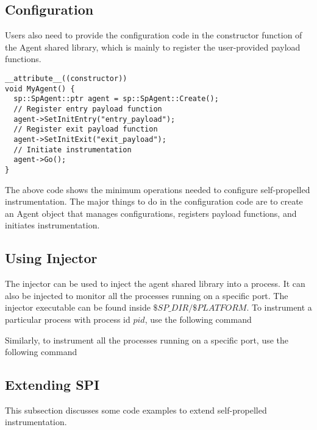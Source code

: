 \subsection{Configuration}
Users also need to provide the configuration code in the constructor
function of
the Agent shared library, which is mainly to register the user-provided payload
functions.
\lstset{numbers=left}
\begin{lstlisting}[caption=Configuration code]
__attribute__((constructor))
void MyAgent() {
  sp::SpAgent::ptr agent = sp::SpAgent::Create();
  // Register entry payload function
  agent->SetInitEntry("entry_payload");
  // Register exit payload function
  agent->SetInitExit("exit_payload");
  // Initiate instrumentation
  agent->Go();
}
\end{lstlisting}
The above code shows the minimum operations needed to configure self-propelled
instrumentation.  The major things to do in the configuration code are to create
an Agent object that manages configurations, registers payload functions, and
initiates instrumentation.

\subsection{Using Injector}
The injector can be used to inject the agent shared library into a process. It
can also be injected to monitor all the processes running on a specific
port. The injector executable can be found inside $\$SP\_DIR/\$PLATFORM$. To
instrument a particular process with process id $pid$, use the following command


Similarly, to instrument all the processes running on a specific port,
use the following command




\subsection{Extending SPI}
This subsection discusses some code examples to extend self-propelled
instrumentation.
